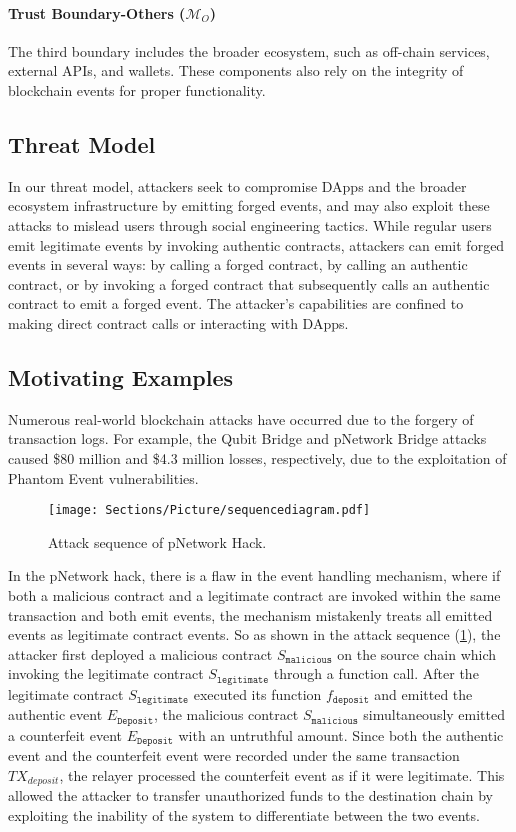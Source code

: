 \paragraph{Trust Boundary-Others (\(\bm{\mathcal{M}}_{O}\))}
The third boundary includes the broader ecosystem, such as off-chain services, external APIs, and wallets. These components also rely on the integrity of blockchain events for proper functionality.

\subsection{Threat Model}
In our threat model, attackers seek to compromise DApps and the broader ecosystem infrastructure by emitting forged events, and may also exploit these attacks to mislead users through social engineering tactics. While regular users emit legitimate events by invoking authentic contracts, attackers can emit forged events in several ways: by calling a forged contract, by calling an authentic contract, or by invoking a forged contract that subsequently calls an authentic contract to emit a forged event. The attacker's capabilities are confined to making direct contract calls or interacting with DApps.

\subsection{Motivating Examples}\label{sec:motivation}
Numerous real-world blockchain attacks have occurred due to the forgery of transaction logs.
For example, the Qubit Bridge and pNetwork Bridge attacks~\cite{Qubit,pNetwork} caused \$80 million and \$4.3 million losses, respectively, due to the exploitation of Phantom Event vulnerabilities.

\begin{figure}[h]
    \centering
    \texttt{[image: Sections/Picture/sequencediagram.pdf]}
    \caption{Attack sequence of pNetwork Hack.}
    \label{fig:sqeuence}
\end{figure}

In the pNetwork hack, there is a flaw in the event handling mechanism, where if both a malicious
contract and a legitimate contract are invoked within the same transaction and both emit events,
the mechanism mistakenly treats all emitted events as legitimate contract events. So as shown in
the attack sequence (\cref{fig:sqeuence}), the attacker first deployed a malicious contract
$S_{\texttt{malicious}}$ on the source chain which invoking the legitimate contract
$S_{\texttt{legitimate}}$ through a function call. After the legitimate contract
$S_{\texttt{legitimate}}$ executed its function $f_{\texttt{deposit}}$ and emitted the authentic
event $E_{\texttt{Deposit}}$, the malicious contract $S_{\texttt{malicious}}$ simultaneously
emitted a counterfeit event $E_{\texttt{Deposit}}$ with an untruthful amount.
Since both the authentic event and the counterfeit event were recorded under the same transaction
$TX_{\textit{deposit}}$, the relayer processed the counterfeit event as if it were legitimate.
This allowed the attacker to transfer unauthorized funds to the destination chain by exploiting the
inability of the system to differentiate between the two events.

